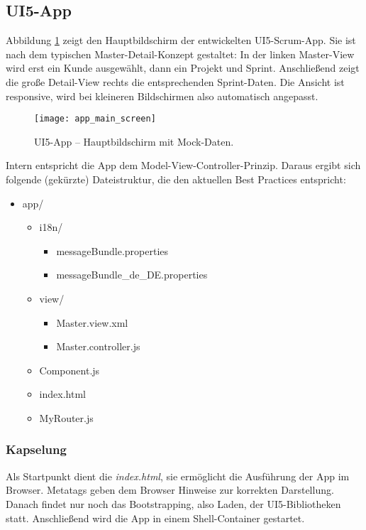 \subsection{UI5-App}
Abbildung \ref{fig:app_main_screen} zeigt den Hauptbildschirm der entwickelten UI5-Scrum-App. Sie ist nach dem typischen Master-Detail-Konzept gestaltet: In der linken Master-View wird erst ein Kunde ausgewählt, dann ein Projekt und Sprint. Anschließend zeigt die große Detail-View rechts die entsprechenden Sprint-Daten. Die Ansicht ist responsive, wird bei kleineren Bildschirmen also automatisch angepasst.

\begin{figure}
	\centering
	\texttt{[image: app\_main\_screen]} 
	\caption[UI5-App -- Hauptbildschirm]{UI5-App -- Hauptbildschirm mit Mock-Daten.}
	\label{fig:app_main_screen}
\end{figure}

Intern entspricht die App dem Model-View-Controller-Prinzip. Daraus ergibt sich folgende (gekürzte) Dateistruktur, die den aktuellen Best Practices entspricht:
\begin{itemize}
	\item app/
	\begin{itemize}
		\item i18n/
		\begin{itemize}
			\item messageBundle.properties
			\item messageBundle\_de\_DE.properties
		\end{itemize}		
		\item view/
		\begin{itemize}
			\item Master.view.xml
			\item Master.controller.js
		\end{itemize}
		\item Component.js
		\item index.html
		\item MyRouter.js
	\end{itemize}
\end{itemize}

\subsubsection{Kapselung}
Als Startpunkt dient die \textit{index.html}, sie ermöglicht die Ausführung der App im Browser. Metatags geben dem Browser Hinweise zur korrekten Darstellung. Danach findet nur noch das Bootstrapping, also Laden, der UI5-Bibliotheken statt. Anschließend wird die App in einem Shell-Container gestartet.

